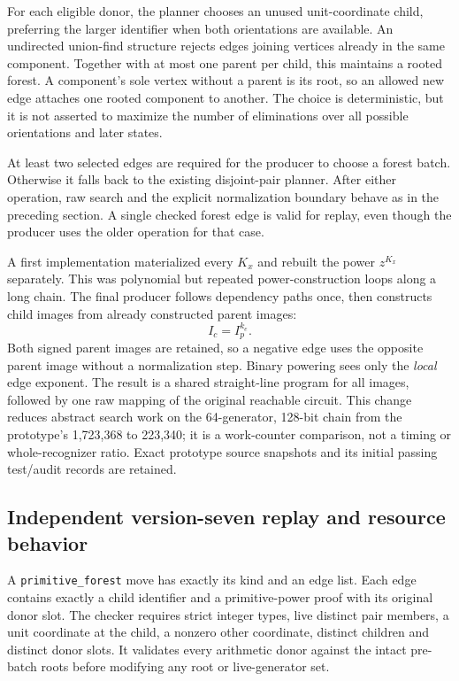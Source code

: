 For each eligible donor, the planner chooses an unused unit-coordinate
child, preferring the larger identifier when both orientations are available.
An undirected union-find structure rejects edges joining vertices already
in the same component. Together with at most one parent per child, this
maintains a rooted forest. A component's sole vertex without a parent is
its root, so an allowed new edge attaches one rooted component to another.
The choice is deterministic, but it is not asserted to maximize the number
of eliminations over all possible orientations and later states.

At least two selected edges are required for the producer to choose a
forest batch. Otherwise it falls back to the existing disjoint-pair planner.
After either operation, raw search and the explicit normalization boundary
behave as in the preceding section. A single checked forest edge is valid
for replay, even though the producer uses the older operation for that case.

A first implementation materialized every $K_x$ and rebuilt the power
$z^{K_x}$ separately. This was polynomial but repeated power-construction
loops along a long chain. The final producer follows dependency paths once,
then constructs child images from already constructed parent images:
\[
 I_c=I_p^{k_e}.
\]
Both signed parent images are retained, so a negative edge uses the opposite
parent image without a normalization step. Binary powering sees only the
\emph{local} edge exponent. The result is a shared straight-line program
for all images, followed by one raw mapping of the original reachable
circuit. This change reduces abstract search work on the 64-generator,
128-bit chain from the prototype's 1,723,368 to 223,340; it is a work-counter
comparison, not a timing or whole-recognizer ratio. Exact prototype source
snapshots and its initial passing test/audit records are retained.

\subsection{Independent version-seven replay and resource behavior}

A \texttt{primitive\_forest} move has exactly its kind and an edge list.
Each edge contains exactly a child identifier and a primitive-power proof
with its original donor slot. The checker requires strict integer types,
live distinct pair members, a unit coordinate at the child, a nonzero other
coordinate, distinct children and distinct donor slots. It validates every
arithmetic donor against the intact pre-batch roots before modifying any
root or live-generator set.

